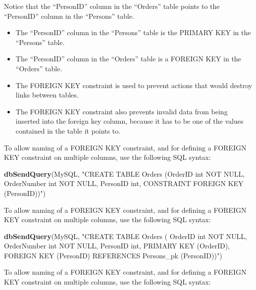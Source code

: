 \documentclass[
]{book}
\newenvironment{Shaded}{\begin{snugshade}}{\end{snugshade}}
\newcommand{\FunctionTok}[1]{\textcolor[rgb]{0.13,0.29,0.53}{\textbf{#1}}}
\newcommand{\NormalTok}[1]{#1}
\newcommand{\StringTok}[1]{\textcolor[rgb]{0.31,0.60,0.02}{#1}}
\providecommand{\tightlist}{%
  \setlength{\itemsep}{0pt}\setlength{\parskip}{0pt}}
\begin{document}
Notice that the ``PersonID'' column in the ``Orders'' table points to the ``PersonID'' column in the ``Persons'' table.

\begin{itemize}
\tightlist
\item
  The ``PersonID'' column in the ``Persons'' table is the PRIMARY KEY in the ``Persons'' table.
\item
  The ``PersonID'' column in the ``Orders'' table is a FOREIGN KEY in the ``Orders'' table.
\item
  The FOREIGN KEY constraint is used to prevent actions that would destroy links between tables.
\item
  The FOREIGN KEY constraint also prevents invalid data from being inserted into the foreign key column, because it has to be one of the values contained in the table it points to.
\end{itemize}

To allow naming of a FOREIGN KEY constraint, and for defining a FOREIGN KEY constraint on multiple columns, use the following SQL syntax:

\begin{Shaded}
\begin{Highlighting}[]
\FunctionTok{dbSendQuery}\NormalTok{(MySQL,}
\StringTok{"CREATE TABLE Orders (OrderID int NOT NULL,}
\StringTok{                     OrderNumber int NOT NULL,}
\StringTok{                     PersonID int,}
\StringTok{                     CONSTRAINT FOREIGN KEY (PersonID))"}\NormalTok{)}
\end{Highlighting}
\end{Shaded}

To allow naming of a FOREIGN KEY constraint, and for defining a FOREIGN KEY constraint on multiple columns, use the following SQL syntax:

\begin{Shaded}
\begin{Highlighting}[]
\FunctionTok{dbSendQuery}\NormalTok{(MySQL,}
\StringTok{"CREATE TABLE Orders (}
\StringTok{    OrderID int NOT NULL,}
\StringTok{    OrderNumber int NOT NULL,}
\StringTok{    PersonID int,}
\StringTok{    PRIMARY KEY (OrderID),}
\StringTok{    FOREIGN KEY (PersonID) REFERENCES Persons\_pk (PersonID))"}\NormalTok{)}
\end{Highlighting}
\end{Shaded}

To allow naming of a FOREIGN KEY constraint, and for defining a FOREIGN KEY constraint on multiple columns, use the following SQL syntax:
\end{document}
